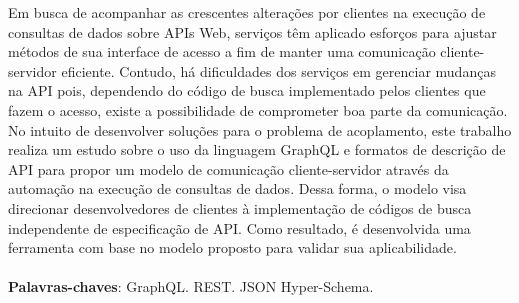\begin{resumo}
  Em busca de acompanhar as crescentes alterações por clientes na execução de consultas de dados sobre APIs Web, serviços têm aplicado esforços para ajustar métodos de sua interface de acesso a fim de manter uma comunicação cliente-servidor eficiente. Contudo, há dificuldades dos serviços em gerenciar mudanças na API pois, dependendo do código de busca implementado pelos clientes que fazem o acesso, existe a possibilidade de comprometer boa parte da comunicação. No intuito de desenvolver soluções para o problema de acoplamento, este trabalho realiza um estudo sobre o uso da linguagem GraphQL e formatos de descrição de API para propor um modelo de comunicação cliente-servidor através da automação na execução de consultas de dados. Dessa forma, o modelo visa direcionar desenvolvedores de clientes à implementação de códigos de busca independente de especificação de API. Como resultado, é desenvolvida uma ferramenta com base no modelo proposto para validar sua aplicabilidade. \\ \\
  \textbf{Palavras-chaves}: GraphQL. REST. JSON Hyper-Schema.
\end{resumo}
